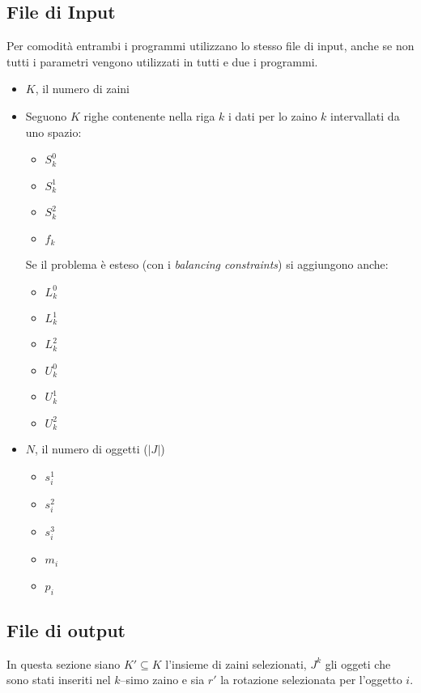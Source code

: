 \documentclass{scrartcl}
\begin{document}
\subsection{File di Input}
Per comodità entrambi i programmi utilizzano lo stesso file di input, anche se non tutti i parametri vengono utilizzati in tutti e due i programmi.
\begin{itemize}
	\item $K$, il numero di zaini
	\item Seguono $K$ righe contenente nella riga $k$ i dati per lo zaino $k$ intervallati da uno spazio:
	\begin{itemize}
		\item $S_k^0$
		\item $S_k^1$
		\item $S_k^2$
		\item $f_k$
	\end{itemize} 
	Se il problema è esteso (con i \emph{balancing constraints}) si aggiungono anche:
	\begin{itemize}
		\item $L_k^0$
		\item $L_k^1$
		\item $L_k^2$
		\item $U_k^0$
		\item $U_k^1$
		\item $U_k^2$
	\end{itemize}
	\item $N$, il numero di oggetti ($|J|$)
	\begin{itemize}
		\item $s_i^1$
		\item $s_i^2$
		\item $s_i^3$
		\item $m_i$
		\item $p_i$
	\end{itemize}
\end{itemize}

\subsection{File di output}
In questa sezione siano $K' \subseteq K$ l'insieme di zaini selezionati, 
$J^k$ gli oggeti che sono stati inseriti nel $k$--simo zaino e sia $r'$ la rotazione selezionata per l'oggetto $i$.
\end{document}
